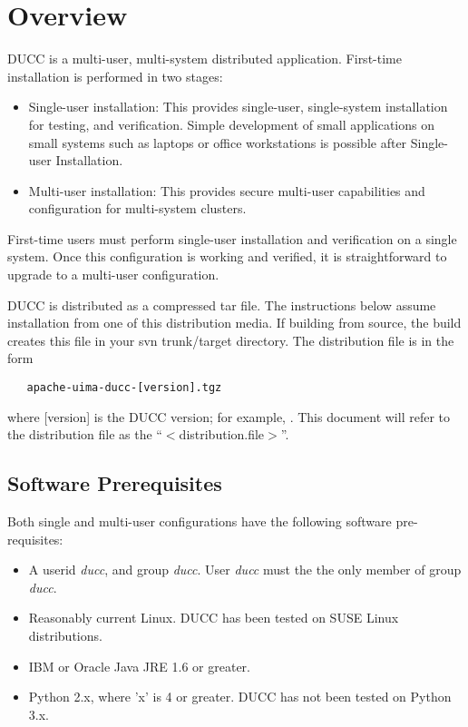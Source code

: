 \section{Overview}

DUCC is a multi-user, multi-system distributed application.  First-time installation is performed in
two stages:

\begin{itemize}
    \item Single-user installation: This provides single-user, single-system installation for testing,
      and verification. Simple development of small applications on small systems such as laptops or
      office workstations is possible after Single-user Installation.
      
    \item Multi-user installation: This provides secure multi-user capabilities and configuration
      for multi-system clusters.
\end{itemize}

First-time users must perform single-user installation and verification on a single system.  Once
this configuration is working and verified, it is straightforward to upgrade to a multi-user
configuration.

DUCC is distributed as a compressed tar file.  The instructions below assume installation from one
of this distribution media.  If building from source, the build creates this file in your svn
trunk/target directory. The distribution file is in the form
\begin{verbatim}
   apache-uima-ducc-[version].tgz
\end{verbatim}
where [version] is the DUCC version; for example, {\em \distro}.  This document will refer to the distribution
file as the ``$<$distribution.file$>$''.

\subsection{Software Prerequisites}
Both single and multi-user configurations have the following software pre-requisites:

\begin{itemize}
  \item A userid {\em ducc}, and group {\em ducc}.  User {\em ducc} must the the only member of group {\em ducc}.
  \item Reasonably current Linux.  DUCC has been tested on SUSE Linux distributions.
  \item IBM or Oracle Java JRE 1.6 or greater.
  \item Python 2.x, where 'x' is 4 or greater.  DUCC has not been tested on Python 3.x.
\end{itemize}
  
